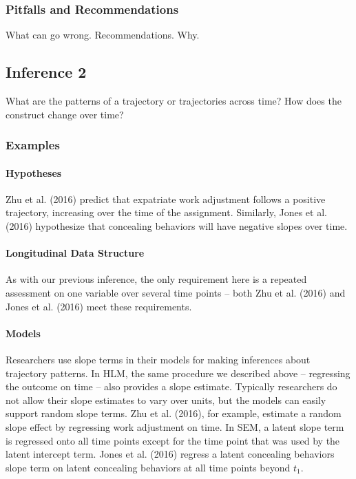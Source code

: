 \documentclass[english,,man]{apa6}
\let\oldparagraph\paragraph
\renewcommand{\paragraph}[1]{\oldparagraph{#1}\mbox{}}
\theoremstyle{definition}
\theoremstyle{definition}
\theoremstyle{definition}
\theoremstyle{remark}
\begin{document}
\hypertarget{pitfalls-and-recommendations-1}{%
\subsubsection{Pitfalls and
Recommendations}\label{pitfalls-and-recommendations-1}}

What can go wrong. Recommendations. Why.

\hypertarget{inference-2}{%
\subsection{Inference 2}\label{inference-2}}

What are the patterns of a trajectory or trajectories across time? How
does the construct change over time?

\hypertarget{examples-2}{%
\subsubsection{Examples}\label{examples-2}}

\hypertarget{hypotheses-2}{%
\paragraph{Hypotheses}\label{hypotheses-2}}

Zhu et al. (2016) predict that expatriate work adjustment follows a
positive trajectory, increasing over the time of the assignment.
Similarly, Jones et al. (2016) hypothesize that concealing behaviors
will have negative slopes over time.

\hypertarget{longitudinal-data-structure-2}{%
\paragraph{Longitudinal Data
Structure}\label{longitudinal-data-structure-2}}

As with our previous inference, the only requirement here is a repeated
assessment on one variable over several time points -- both Zhu et al.
(2016) and Jones et al. (2016) meet these requirements.

\hypertarget{models-2}{%
\paragraph{Models}\label{models-2}}

Researchers use slope terms in their models for making inferences about
trajectory patterns. In HLM, the same procedure we described above --
regressing the outcome on time -- also provides a slope estimate.
Typically researchers do not allow their slope estimates to vary over
units, but the models can easily support random slope terms. Zhu et al.
(2016), for example, estimate a random slope effect by regressing work
adjustment on time. In SEM, a latent slope term is regressed onto all
time points except for the time point that was used by the latent
intercept term. Jones et al. (2016) regress a latent concealing
behaviors slope term on latent concealing behaviors at all time points
beyond \(t_1\).
\end{document}
